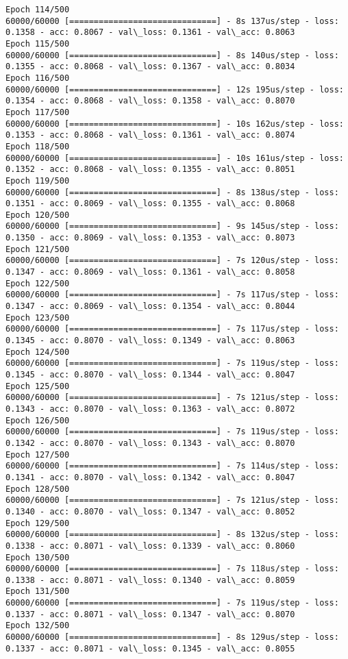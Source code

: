 \documentclass[11pt]{article}
\begin{document}
\begin{Verbatim}[commandchars=\\\{\}]
Epoch 114/500
60000/60000 [==============================] - 8s 137us/step - loss: 0.1358 - acc: 0.8067 - val\_loss: 0.1361 - val\_acc: 0.8063
Epoch 115/500
60000/60000 [==============================] - 8s 140us/step - loss: 0.1355 - acc: 0.8068 - val\_loss: 0.1367 - val\_acc: 0.8034
Epoch 116/500
60000/60000 [==============================] - 12s 195us/step - loss: 0.1354 - acc: 0.8068 - val\_loss: 0.1358 - val\_acc: 0.8070
Epoch 117/500
60000/60000 [==============================] - 10s 162us/step - loss: 0.1353 - acc: 0.8068 - val\_loss: 0.1361 - val\_acc: 0.8074
Epoch 118/500
60000/60000 [==============================] - 10s 161us/step - loss: 0.1352 - acc: 0.8068 - val\_loss: 0.1355 - val\_acc: 0.8051
Epoch 119/500
60000/60000 [==============================] - 8s 138us/step - loss: 0.1351 - acc: 0.8069 - val\_loss: 0.1355 - val\_acc: 0.8068
Epoch 120/500
60000/60000 [==============================] - 9s 145us/step - loss: 0.1350 - acc: 0.8069 - val\_loss: 0.1353 - val\_acc: 0.8073
Epoch 121/500
60000/60000 [==============================] - 7s 120us/step - loss: 0.1347 - acc: 0.8069 - val\_loss: 0.1361 - val\_acc: 0.8058
Epoch 122/500
60000/60000 [==============================] - 7s 117us/step - loss: 0.1347 - acc: 0.8069 - val\_loss: 0.1354 - val\_acc: 0.8044
Epoch 123/500
60000/60000 [==============================] - 7s 117us/step - loss: 0.1345 - acc: 0.8070 - val\_loss: 0.1349 - val\_acc: 0.8063
Epoch 124/500
60000/60000 [==============================] - 7s 119us/step - loss: 0.1345 - acc: 0.8070 - val\_loss: 0.1344 - val\_acc: 0.8047
Epoch 125/500
60000/60000 [==============================] - 7s 121us/step - loss: 0.1343 - acc: 0.8070 - val\_loss: 0.1363 - val\_acc: 0.8072
Epoch 126/500
60000/60000 [==============================] - 7s 119us/step - loss: 0.1342 - acc: 0.8070 - val\_loss: 0.1343 - val\_acc: 0.8070
Epoch 127/500
60000/60000 [==============================] - 7s 114us/step - loss: 0.1341 - acc: 0.8070 - val\_loss: 0.1342 - val\_acc: 0.8047
Epoch 128/500
60000/60000 [==============================] - 7s 121us/step - loss: 0.1340 - acc: 0.8070 - val\_loss: 0.1347 - val\_acc: 0.8052
Epoch 129/500
60000/60000 [==============================] - 8s 132us/step - loss: 0.1338 - acc: 0.8071 - val\_loss: 0.1339 - val\_acc: 0.8060
Epoch 130/500
60000/60000 [==============================] - 7s 118us/step - loss: 0.1338 - acc: 0.8071 - val\_loss: 0.1340 - val\_acc: 0.8059
Epoch 131/500
60000/60000 [==============================] - 7s 119us/step - loss: 0.1337 - acc: 0.8071 - val\_loss: 0.1347 - val\_acc: 0.8070
Epoch 132/500
60000/60000 [==============================] - 8s 129us/step - loss: 0.1337 - acc: 0.8071 - val\_loss: 0.1345 - val\_acc: 0.8055

\end{Verbatim}
\end{document}
